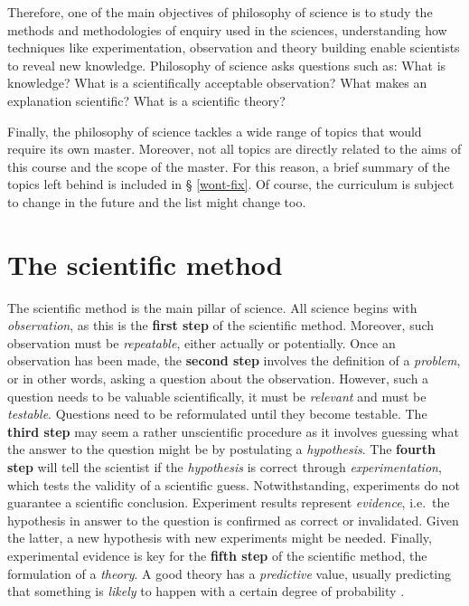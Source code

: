 \documentclass[
]{book}
\begin{document}
Therefore, one of the main objectives of philosophy of science is to study the methods and methodologies of enquiry used in the sciences, understanding how techniques like experimentation, observation and theory building enable scientists to reveal new knowledge. Philosophy of science asks questions such as: What is knowledge? What is a scientifically acceptable observation? What makes an explanation scientific? What is a scientific theory?

Finally, the philosophy of science tackles a wide range of topics that would require its own master. Moreover, not all topics are directly related to the aims of this course and the scope of the master. For this reason, a brief summary of the topics left behind is included in § \ref{wont-fix}. Of course, the curriculum is subject to change in the future and the list might change too.

\hypertarget{sci-method}{%
\section{The scientific method}\label{sci-method}}

The scientific method is the main pillar of science. All science begins with \emph{observation}, as this is the \textbf{first step} of the scientific method. Moreover, such observation must be \emph{repeatable}, either actually or potentially. Once an observation has been made, the \textbf{second step} involves the definition of a \emph{problem}, or in other words, asking a question about the observation. However, such a question needs to be valuable scientifically, it must be \emph{relevant} and must be \emph{testable}. Questions need to be reformulated until they become testable. The \textbf{third step} may seem a rather unscientific procedure as it involves guessing what the answer to the question might be by postulating a \emph{hypothesis}. The \textbf{fourth step} will tell the scientist if the \emph{hypothesis} is correct through \emph{experimentation}, which tests the validity of a scientific guess. Notwithstanding, experiments do not guarantee a scientific conclusion. Experiment results represent \emph{evidence}, i.e.~the hypothesis in answer to the question is confirmed as correct or invalidated. Given the latter, a new hypothesis with new experiments might be needed. Finally, experimental evidence is key for the \textbf{fifth step} of the scientific method, the formulation of a \emph{theory}. A good theory has a \emph{predictive} value, usually predicting that something is \emph{likely} to happen with a certain degree of probability \citep{pos-nidditch}.
\end{document}

